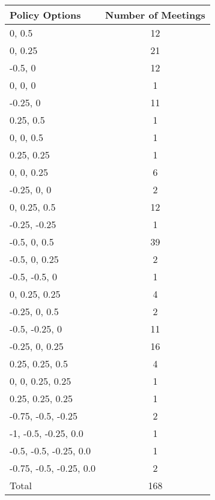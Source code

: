 \begin{tabular}{lc}
\hline\hline 
\addlinespace 
Policy Options & Number of Meetings \\ 
\hline 
0, 0.5 & 12 \\
0, 0.25 & 21 \\
-0.5, 0 & 12 \\
0, 0, 0 & 1 \\
-0.25, 0 & 11 \\
0.25, 0.5 & 1 \\
0, 0, 0.5 & 1 \\
0.25, 0.25 & 1 \\
0, 0, 0.25 & 6 \\
-0.25, 0, 0 & 2 \\
0, 0.25, 0.5 & 12 \\
-0.25, -0.25 & 1 \\
-0.5, 0, 0.5 & 39 \\
-0.5, 0, 0.25 & 2 \\
-0.5, -0.5, 0 & 1 \\
0, 0.25, 0.25 & 4 \\
-0.25, 0, 0.5 & 2 \\
-0.5, -0.25, 0 & 11 \\
-0.25, 0, 0.25 & 16 \\
0.25, 0.25, 0.5 & 4 \\
0, 0, 0.25, 0.25 & 1 \\
0.25, 0.25, 0.25 & 1 \\
-0.75, -0.5, -0.25 & 2 \\
-1, -0.5, -0.25, 0.0 & 1 \\
-0.5, -0.5, -0.25, 0.0 & 1 \\
-0.75, -0.5, -0.25, 0.0 & 2 \\
\addlinespace 
Total & 168 \\
\hline 
\end{tabular}